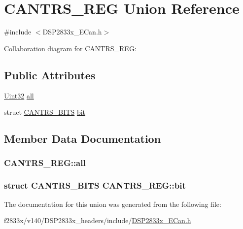 \hypertarget{union_c_a_n_t_r_s___r_e_g}{}\section{C\+A\+N\+T\+R\+S\+\_\+\+R\+E\+G Union Reference}
\label{union_c_a_n_t_r_s___r_e_g}


{\ttfamily \#include $<$D\+S\+P2833x\+\_\+\+E\+Can.\+h$>$}



Collaboration diagram for C\+A\+N\+T\+R\+S\+\_\+\+R\+E\+G\+:
\subsection*{Public Attributes}
\begin{DoxyCompactItemize}
\item 
\hyperlink{_d_s_p2833x___device_8h_aba99025e657f892beb7ff31cecf64653}{Uint32} \hyperlink{union_c_a_n_t_r_s___r_e_g_a79f703654441809fd8fd908b4dee4064}{all}
\item 
struct \hyperlink{struct_c_a_n_t_r_s___b_i_t_s}{C\+A\+N\+T\+R\+S\+\_\+\+B\+I\+T\+S} \hyperlink{union_c_a_n_t_r_s___r_e_g_a83251ae61157059720e961ba42d2d437}{bit}
\end{DoxyCompactItemize}


\subsection{Member Data Documentation}
\hypertarget{union_c_a_n_t_r_s___r_e_g_a79f703654441809fd8fd908b4dee4064}{}
\subsubsection[{all}]{ C\+A\+N\+T\+R\+S\+\_\+\+R\+E\+G\+::all}\label{union_c_a_n_t_r_s___r_e_g_a79f703654441809fd8fd908b4dee4064}
\hypertarget{union_c_a_n_t_r_s___r_e_g_a83251ae61157059720e961ba42d2d437}{}
\subsubsection[{bit}]{\setlength{\rightskip}{0pt plus 5cm}struct {\bf C\+A\+N\+T\+R\+S\+\_\+\+B\+I\+T\+S} C\+A\+N\+T\+R\+S\+\_\+\+R\+E\+G\+::bit}\label{union_c_a_n_t_r_s___r_e_g_a83251ae61157059720e961ba42d2d437}


The documentation for this union was generated from the following file\+:\begin{DoxyCompactItemize}
\item 
f2833x/v140/\+D\+S\+P2833x\+\_\+headers/include/\hyperlink{_d_s_p2833x___e_can_8h}{D\+S\+P2833x\+\_\+\+E\+Can.\+h}\end{DoxyCompactItemize}
